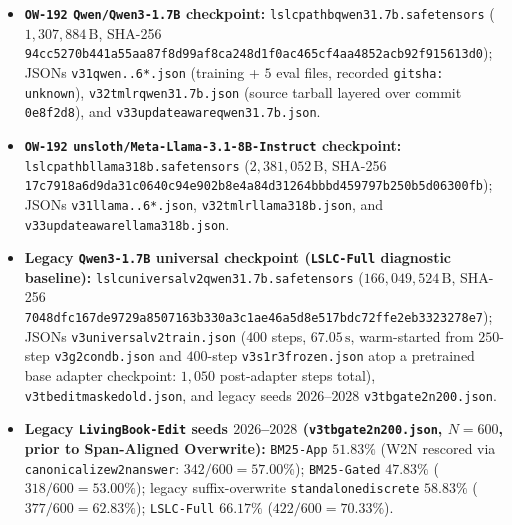 \documentclass[11pt]{article}
\newif\ifanonymous
\renewcommand{\_}{\origunderscore\allowbreak}
\begin{document}
\begin{itemize}
    \item \textbf{\texttt{OW-192} \texttt{Qwen/Qwen3-1.7B} checkpoint:} \texttt{lslc\_pathb\_qwen3\_1.7b.safetensors} ($1{,}307{,}884\,\text{B}$, SHA-256 \texttt{\scriptsize\allowbreak 94cc5270b441a55a\allowbreak a87f8d99af8ca248\allowbreak d1f0ac465cf4aa48\allowbreak 52acb92f915613d0}); JSONs \texttt{v31\_qwen\_1..6*.json} (training + $5$ eval files, recorded \texttt{git\_sha: unknown}), \texttt{v32\_tmlr\_qwen3\_1.7b.json} (source tarball layered over commit \ifanonymous\texttt{[redacted for review]}\else\texttt{0e8f2d8}\fi), and \texttt{v33\_update\_aware\_qwen3\_1.7b.json}.
    \item \textbf{\texttt{OW-192} \texttt{unsloth/\allowbreak Meta-Llama-3.1-8B-Instruct} checkpoint:} \texttt{lslc\_pathb\_llama31\_8b.safetensors} ($2{,}381{,}052\,\text{B}$, SHA-256\\\texttt{\scriptsize 17c7918a6d9da31c\allowbreak 0640c94e902b8e4a\allowbreak 84d31264bbbd4597\allowbreak 97b250b5d06300fb}); JSONs \texttt{v31\_llama\_1..6*.json}, \texttt{v32\_tmlr\_llama31\_8b.json}, and \texttt{v33\_update\_aware\_llama31\_8b.json}.
    \item \textbf{Legacy \texttt{Qwen3-1.7B} universal checkpoint (\texttt{LSLC-Full} diagnostic baseline):} \texttt{lslc\_universal\_v2\_qwen3\_1.7b.safetensors} ($166{,}049{,}524\,\text{B}$, SHA-256 \texttt{\scriptsize 7048dfc167de9729\allowbreak a8507163b330a3c1\allowbreak ae46a5d8e517bdc7\allowbreak 2ffe2eb3323278e7}); JSONs \texttt{v3\_universal\_\allowbreak v2\_train.json} ($400$ steps, $67.05\,\text{s}$, warm-started from $250$-step \texttt{v3\_g2\_cond\_b.json} and $400$-step \texttt{v3\_s1\_r3\_frozen.json} atop a pretrained base adapter checkpoint: $1{,}050$ post-adapter steps total), \texttt{v3\_tb\_1\_edit\_masked\_old.json}, and legacy seeds $2026$--$2028$ \texttt{v3\_tb\_3\_gate2\_n200.json}.
    \item \textbf{Legacy \texttt{LivingBook-Edit} seeds $2026$--$2028$ (\texttt{v3\_tb\_3\_gate2\_n200.json}, $N=600$, prior to Span-Aligned Overwrite):} \texttt{BM25-App} $51.83\%$ (W2N rescored via \texttt{canonicalize\_w2n\_answer}: $342/600 = 57.00\%$); \texttt{BM25-Gated} $47.83\%$ ($318/600 = 53.00\%$); legacy suffix-overwrite \texttt{standalone\_discrete} $58.83\%$ ($377/600 = 62.83\%$); \texttt{LSLC-Full} $66.17\%$ ($422/600 = 70.33\%$).
\end{itemize}

\clearpage
\end{document}

